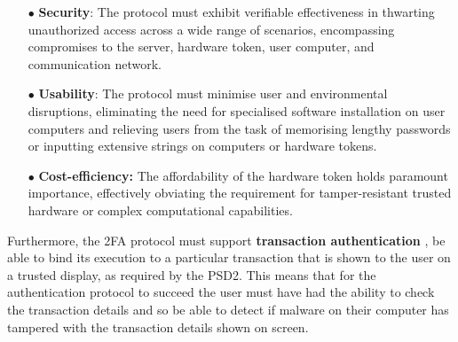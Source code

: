 \begin{itemize}

\item[$\bullet$]\textbf{Security}: The protocol must exhibit verifiable effectiveness in thwarting unauthorized access across a wide range of scenarios, encompassing compromises to the server, hardware token, user computer, and communication network.



\item[$\bullet$]\textbf{Usability}: The protocol must minimise user and environmental disruptions, eliminating the need for specialised software installation on user computers and relieving users from the task of memorising lengthy passwords or inputting extensive strings on computers or hardware tokens.

%

\item[$\bullet$]\textbf{Cost-efficiency:} The affordability of the hardware token holds paramount importance, effectively obviating the requirement for tamper-resistant trusted hardware or complex computational capabilities.



\end{itemize}

Furthermore, the 2FA protocol must support \textbf{transaction authentication} \ie, be able to bind its execution to a particular transaction that is shown to the user on a trusted display, as required by the PSD2.
This means that for the authentication protocol to succeed the user must have had the ability to check the transaction details and so be able to detect if malware on their computer has tampered with the transaction details shown on screen.



